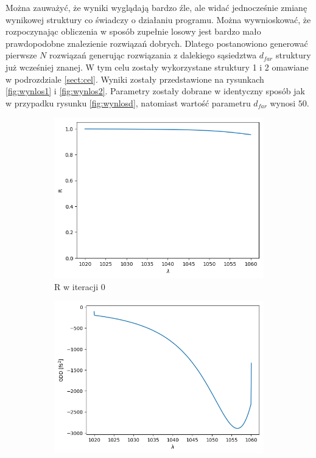 Można zauważyć, że wyniki wyglądają bardzo źle, ale widać jednocześnie zmianę wynikowej struktury co świadczy o działaniu programu. Można wywnioskować, że rozpoczynając obliczenia w sposób zupełnie losowy jest bardzo mało prawdopodobne znalezienie rozwiązań dobrych. Dlatego postanowiono generować pierwsze $N$ rozwiązań generując rozwiązania z dalekiego sąsiedztwa $d_{far}$ struktury już wcześniej znanej. W tym celu zostały wykorzystane struktury 1 i 2 omawiane w podrozdziale \ref{sect:cel}. Wyniki zostały przedstawione na rysunkach \ref{fig:wynlos1} i \ref{fig:wynlos2}. Parametry zostały dobrane w identyczny sposób jak w przypadku rysunku \ref{fig:wynlosd}, natomiast wartość parametru $d_{far}$ wynosi $50$.

\begin{figure} [H]
    \centering
    \begin{subfigure}[b]{0.30\textwidth}
        \includegraphics[width=\linewidth]{figures/wyniki/losowe/dbr/result_Rresult0.png}
        \caption{R w iteracji 0}
    \end{subfigure}
            \begin{subfigure}[b]{0.31\textwidth}
        \includegraphics[width=\linewidth]{figures/wyniki/losowe/dbr/result_gddresult0.png}

\end{subfigure}
\end{figure}
